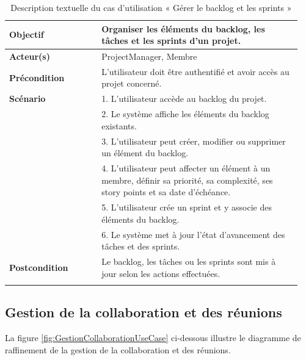 \begin{longtable}[c]{|p{0.3\linewidth}|p{0.65\linewidth}|}
  \textbf{Objectif}      & Organiser les éléments du backlog, les tâches et les sprints d'un projet.                                                          \\
  \hline
  \textbf{Acteur(s)}     & ProjectManager, Membre                                                                                                             \\
  \hline
  \textbf{Précondition}  & L'utilisateur doit être authentifié et avoir accès au projet concerné.                                                             \\
  \hline
  \textbf{Scénario}      &
  1. L'utilisateur accède au backlog du projet.                                                                                                               \\
                         & 2. Le système affiche les éléments du backlog existants.                                                                           \\
                         & 3. L'utilisateur peut créer, modifier ou supprimer un élément du backlog.                                                          \\
                         & 4. L'utilisateur peut affecter un élément à un membre, définir sa priorité, sa complexité, ses story points et sa date d'échéance. \\
                         & 5. L'utilisateur crée un sprint et y associe des éléments du backlog.                                                              \\
                         & 6. Le système met à jour l'état d'avancement des tâches et des sprints.                                                            \\
  \hline
  \textbf{Postcondition} & Le backlog, les tâches ou les sprints sont mis à jour selon les actions effectuées.                                                \\
  \hline
  \caption{\centering Description textuelle du cas d'utilisation « Gérer le backlog et les sprints »}
\end{longtable}
\subsection{Gestion de la collaboration et des réunions}

La figure \ref{fig:GestionCollaborationUseCase} ci-dessous illustre le diagramme de raffinement de la gestion de la collaboration et des réunions.

